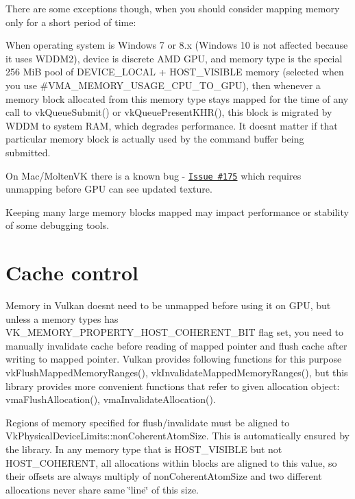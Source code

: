 There are some exceptions though, when you should consider mapping memory only for a short period of time\+:


\begin{DoxyItemize}
\item When operating system is Windows 7 or 8.\+x (Windows 10 is not affected because it uses W\+D\+D\+M2), device is discrete A\+MD G\+PU, and memory type is the special 256 MiB pool of {\ttfamily D\+E\+V\+I\+C\+E\+\_\+\+L\+O\+C\+AL + H\+O\+S\+T\+\_\+\+V\+I\+S\+I\+B\+LE} memory (selected when you use \#\+V\+M\+A\+\_\+\+M\+E\+M\+O\+R\+Y\+\_\+\+U\+S\+A\+G\+E\+\_\+\+C\+P\+U\+\_\+\+T\+O\+\_\+\+G\+PU), then whenever a memory block allocated from this memory type stays mapped for the time of any call to {\ttfamily vk\+Queue\+Submit()} or {\ttfamily vk\+Queue\+Present\+K\+H\+R()}, this block is migrated by W\+D\+DM to system R\+AM, which degrades performance. It doesn\textquotesingle{}t matter if that particular memory block is actually used by the command buffer being submitted.
\item On Mac/\+Molten\+VK there is a known bug -\/ \href{https://github.com/KhronosGroup/MoltenVK/issues/175}{\tt Issue \#175} which requires unmapping before G\+PU can see updated texture.
\item Keeping many large memory blocks mapped may impact performance or stability of some debugging tools.
\end{DoxyItemize}\hypertarget{memory_mapping_memory_mapping_cache_control}{}\section{Cache control}\label{memory_mapping_memory_mapping_cache_control}
Memory in Vulkan doesn\textquotesingle{}t need to be unmapped before using it on G\+PU, but unless a memory types has {\ttfamily V\+K\+\_\+\+M\+E\+M\+O\+R\+Y\+\_\+\+P\+R\+O\+P\+E\+R\+T\+Y\+\_\+\+H\+O\+S\+T\+\_\+\+C\+O\+H\+E\+R\+E\+N\+T\+\_\+\+B\+IT} flag set, you need to manually invalidate cache before reading of mapped pointer and flush cache after writing to mapped pointer. Vulkan provides following functions for this purpose {\ttfamily vk\+Flush\+Mapped\+Memory\+Ranges()}, {\ttfamily vk\+Invalidate\+Mapped\+Memory\+Ranges()}, but this library provides more convenient functions that refer to given allocation object\+: vma\+Flush\+Allocation(), vma\+Invalidate\+Allocation().

Regions of memory specified for flush/invalidate must be aligned to {\ttfamily Vk\+Physical\+Device\+Limits\+::non\+Coherent\+Atom\+Size}. This is automatically ensured by the library. In any memory type that is {\ttfamily H\+O\+S\+T\+\_\+\+V\+I\+S\+I\+B\+LE} but not {\ttfamily H\+O\+S\+T\+\_\+\+C\+O\+H\+E\+R\+E\+NT}, all allocations within blocks are aligned to this value, so their offsets are always multiply of {\ttfamily non\+Coherent\+Atom\+Size} and two different allocations never share same \char`\"{}line\char`\"{} of this size.

